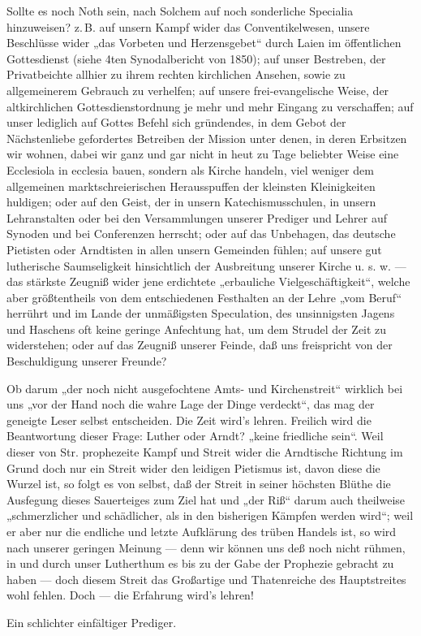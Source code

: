 Sollte es noch Noth sein, nach Solchem auf noch sonderliche Specialia hinzuweisen? z.\,B. auf unsern Kampf wider
das Conventikelwesen, unsere Beschlüsse wider „das Vorbeten und Herzensgebet“ durch Laien im öffentlichen
Gottesdienst (siehe 4ten Synodalbericht von 1850); auf unser Bestreben, der Privatbeichte allhier zu ihrem
rechten kirchlichen Ansehen, sowie zu allgemeinerem Gebrauch zu verhelfen; auf unsere frei-evangelische Weise,
der altkirchlichen Gottesdienstordnung je mehr und mehr Eingang zu verschaffen; auf unser lediglich auf Gottes
Befehl sich gründendes, in dem Gebot der Nächstenliebe gefordertes Betreiben der Mission unter denen, in deren
Erbsitzen wir wohnen, dabei wir ganz und gar nicht in heut zu Tage beliebter Weise eine Ecclesiola in ecclesia
bauen, sondern als Kirche handeln, viel weniger dem allgemeinen marktschreierischen Herausspuffen der kleinsten
Kleinigkeiten huldigen; oder auf den Geist, der in unsern Katechismusschulen, in unsern Lehranstalten oder bei
den Versammlungen unserer Prediger und Lehrer auf Synoden und bei Conferenzen herrscht; oder auf das Unbehagen,
das deutsche Pietisten oder Arndtisten in allen unsern Gemeinden fühlen; auf unsere gut lutherische Saumseligkeit
hinsichtlich der Ausbreitung unserer Kirche u. s. w. — das stärkste Zeugniß wider jene erdichtete „erbauliche
Vielgeschäftigkeit“, welche aber größtentheils von dem entschiedenen Festhalten an der Lehre „vom Beruf“
herrührt und im Lande der unmäßigsten Speculation, des unsinnigsten Jagens und Haschens oft keine geringe
Anfechtung hat, um dem Strudel der Zeit zu widerstehen; oder auf das Zeugniß unserer Feinde, daß uns freispricht
von der Beschuldigung unserer Freunde?

Ob darum „der noch nicht ausgefochtene Amts- und Kirchenstreit“ wirklich
bei uns „vor der Hand noch die wahre Lage der Dinge verdeckt“, das mag der geneigte Leser selbst
entscheiden. Die Zeit wird’s lehren. Freilich wird die Beantwortung dieser Frage: Luther oder Arndt? „keine
friedliche sein“. Weil dieser von Str. prophezeite Kampf und Streit wider die Arndtische Richtung im Grund doch
nur ein Streit wider den leidigen Pietismus ist, davon diese die Wurzel ist, so folgt es von selbst, daß der Streit
in seiner höchsten Blüthe die Ausfegung dieses Sauerteiges zum Ziel hat und „der Riß“ darum auch theilweise
„schmerzlicher und schädlicher, als in den bisherigen Kämpfen werden wird“; weil er aber nur die endliche
und letzte Aufklärung des trüben Handels ist, so wird nach unserer geringen Meinung — denn wir können uns
deß noch nicht rühmen, in und durch unser Lutherthum es bis zu der Gabe der Prophezie gebracht zu haben — doch
diesem Streit das Großartige und Thatenreiche des Hauptstreites wohl fehlen. Doch — die Erfahrung wird’s lehren!

\begin{unterschrift}
Ein schlichter einfältiger Prediger.
\end{unterschrift}
